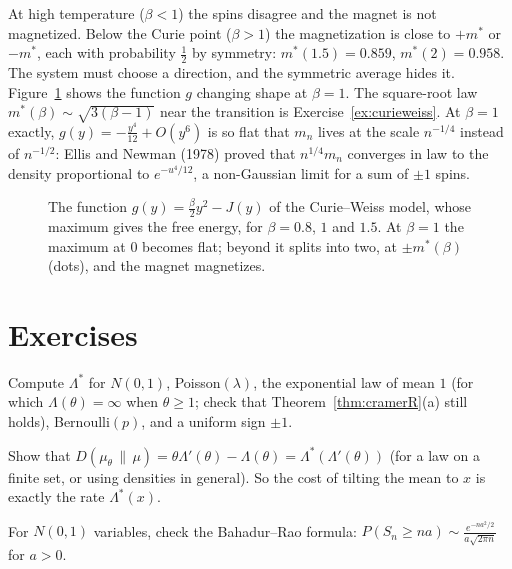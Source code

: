 At high temperature ($\beta<1$) the spins disagree and the magnet is not magnetized. Below the Curie point ($\beta>1$) the magnetization is close to $+m^*$ or $-m^*$, each with
probability $\frac12$ by symmetry: $m^*(1.5)=0.859$, $m^*(2)=0.958$. The system must choose a direction, and the symmetric average hides it. Figure~\ref{fig:curieweiss} shows the
function $g$ changing shape at $\beta=1$. The square-root law $m^*(\beta)\sim\sqrt{3(\beta-1)}$ near the transition is Exercise~\ref{ex:curieweiss}. At $\beta=1$ exactly, $g(y)=-\frac{y^4}{12}+O(y^6)$ is so flat that
$m_n$ lives at the scale $n^{-1/4}$ instead of $n^{-1/2}$: Ellis and Newman (1978) proved that $n^{1/4}m_n$ converges in law to the density proportional to $e^{-u^4/12}$, a
non-Gaussian limit for a sum of $\pm1$ spins.

\begin{figure}[ht]
\centering{}
\caption{The function $g(y)=\frac\beta2y^2-J(y)$ of the Curie--Weiss model, whose maximum gives the free energy, for $\beta=0.8$, $1$ and $1.5$. At $\beta=1$ the maximum at $0$
becomes flat; beyond it splits into two, at $\pm m^*(\beta)$ (dots), and the magnet magnetizes.}
\label{fig:curieweiss}
\end{figure}

\section{Exercises}

\begin{exercise}[$\star$]\label{ex:ratefns}
Compute $\Lambda^*$ for $N(0,1)$, Poisson$(\lambda)$, the exponential law of mean $1$ (for which $\Lambda(\theta)=\infty$ when $\theta\ge1$; check that Theorem~\ref{thm:cramerR}(a) still
holds), Bernoulli$(p)$, and a uniform sign $\pm1$.
\end{exercise}

\begin{exercise}[$\star$]\label{ex:tiltentropy}
Show that $D(\mu_\theta\,\|\,\mu)=\theta\Lambda'(\theta)-\Lambda(\theta)=\Lambda^*(\Lambda'(\theta))$ (for a law on a finite set, or using densities in general). So the cost of tilting the mean to $x$
is exactly the rate $\Lambda^*(x)$.
\end{exercise}

\begin{exercise}[$\star$]\label{ex:gaussprefactor}
For $N(0,1)$ variables, check the Bahadur--Rao formula: $P(S_n\ge na)\sim\frac{e^{-na^2/2}}{a\sqrt{2\pi n}}$ for $a>0$.
\end{exercise}

